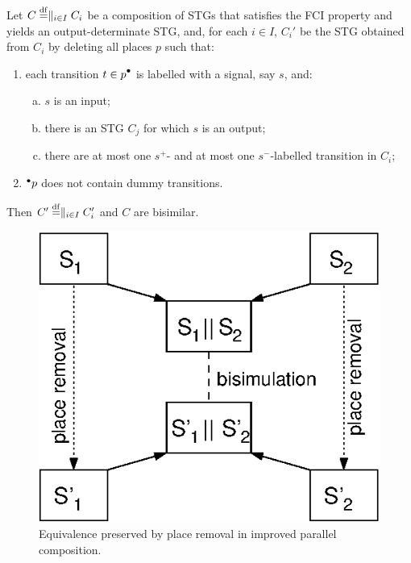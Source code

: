 \begin{proposition}\label{pr-main}
Let $C\stackrel{\mathrm{df}}{=}\parallel_{i\in I}C_{i}$ be a composition of STGs
that satisfies the FCI property and yields an
output-determinate STG, and, for each $i\in I$, $C_{i}'$ be the
STG obtained from $C_{i}$ by deleting all places $p$ such that:
\begin{enumerate}[1.]
\item each transition $t\in\post{p}$ is labelled with a
    signal, say $s$, and:
\begin{enumerate}[a)]
\item\label{only-inputs-in-postset} $s$ is an input;
\item\label{exists-matching-output} there is an STG $C_j$ for which $s$ is an output;
\item\label{injective-labelling} there are at most one
    $s^+$- and at most one $s^-$-la\-bel\-led
    transition in $C_i$;
\end{enumerate}
\item\label{no-dummies-in-preset} ${}^\bullet {p}$ does not
    contain dummy transitions.
\end{enumerate}
Then $C'\stackrel{\mathrm{df}}{=}\parallel_{i\in I}C_i'$ and $C$ are bisimilar.
\end{proposition}

\begin{figure}[!tb]
  \begin{centering}
    \includegraphics[scale=0.3]{fig/parallel_composition}
  \end{centering}
  \caption{\label{fi-parcomp-improvement-theorem}
    Equivalence preserved by place removal in improved parallel composition.
  }
\end{figure}



